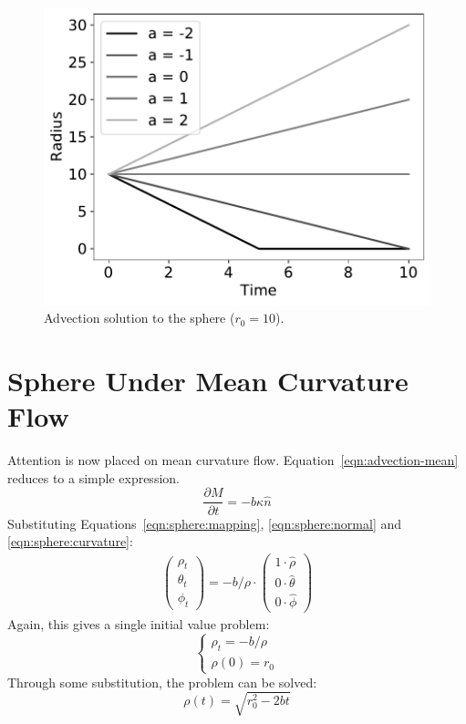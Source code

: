 \documentclass[journal]{IEEEtran}
\begin{document}
\begin{figure}[t]
  \centering
    \includegraphics[width=0.9\linewidth]{advection}%
  \caption{Advection solution to the sphere ($r_0 = 10$).}
  \label{fig:advection}
\end{figure}

\section{Sphere Under Mean Curvature Flow}
\label{sec:meanflow}
Attention is now placed on mean curvature flow.
Equation~\ref{eqn:advection-mean} reduces to a simple expression.
\begin{equation}
  \label{eqn:mean}
  \frac{\partial M}{\partial t} = -b \kappa \hat{n}
\end{equation}
Substituting Equations~\ref{eqn:sphere:mapping}, \ref{eqn:sphere:normal} and \ref{eqn:sphere:curvature}:
\begin{align}
  \begin{pmatrix}
    \rho_t \\
    \theta_t \\
    \phi_t
  \end{pmatrix} = -b / \rho \cdot
  \begin{pmatrix}
    1 \cdot \hat{\rho} \\
    0 \cdot \hat{\theta} \\
    0 \cdot \hat{\phi}
  \end{pmatrix}
\end{align}
Again, this gives a single initial value problem:
\begin{equation}
  \left\{
    \begin{array}{ll}
      \rho_t = -b/\rho\\
      \rho(0) = r_0
    \end{array}
  \right.
\end{equation}
Through some substitution, the problem can be solved:
\begin{equation}
  \label{eqn:mean:solution}
  \rho(t) = \sqrt{r_0^2 - 2bt}
\end{equation}
\end{document}
